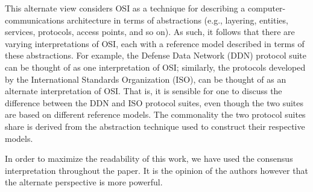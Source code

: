 This alternate view considers OSI as a technique for describing a
com\-put\-er-com\-mun\-i\-cat\-ions architecture in terms of abstractions
(e.g., layering, entities, services, protocols, access points, and so on).
As such, it follows that there are varying interpretations of OSI,
each with a reference model described in terms of these abstractions.
For example,
the Defense Data Network (DDN) protocol suite can be thought of as one
interpretation of OSI;
similarly,
the protocols developed by the International Standards Organization (ISO),
can be thought of as an alternate interpretation of OSI.
That is,
it is sensible for one to discuss
the difference between the DDN and ISO protocol suites,
even though the two suites are based on different reference models.
The commonality the two protocol suites share is derived from the abstraction
technique used to construct their respective models.

In order to maximize the readability of this work,
we have used the consensus interpretation throughout the paper.
It is the opinion of the authors however that the alternate perspective is
more powerful.
